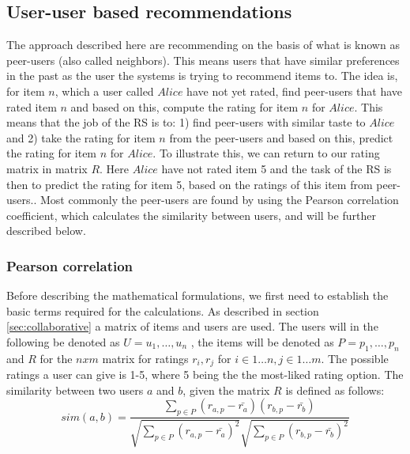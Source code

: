 \subsection{User-user based recommendations} %
\label{sub:user_user_based_recommendations}
The approach described here are recommending on the basis of what is known as peer-users (also called neighbors). This means users that have similar preferences in the past as the user the systems is trying to recommend items to. The idea is, for item \(n\), which a user called \(Alice\) have not yet rated, find peer-users that have rated item \(n\) and based on this, compute the rating for item \(n\) for \(Alice\). This means that the job of the RS is to: 1) find peer-users with similar taste to \(Alice\) and 2) take the rating for item \(n\) from the peer-users and based on this, predict the rating for item \(n\) for \(Alice\).\newline
To illustrate this, we can return to our rating matrix in matrix \(R\). Here \(Alice\) have not rated item 5 and the task of the RS is then to predict the rating for item 5, based on the ratings of this item from peer-users.. Most commonly the peer-users are found by using the Pearson correlation coefficient\citep{IntroductionRecommenderSystems}, which calculates the similarity between users, and will be further described below.

\subsubsection{Pearson correlation}
Before describing the mathematical formulations, we first need to establish the basic terms required for the calculations. As described in section \ref{sec:collaborative} a matrix of items and users are used. The users will in the following be denoted as \( U = {u_{1}, \ldots , u_{n}} \) , the items will be denoted as \( P = {p_{1}, \ldots , p_{n}} \) and \(R\) for the \({n x m}\) matrix for ratings \(r_{i}, r_{j}\) for \(i \in 1 \ldots n, j \in 1 \ldots m\). The possible ratings a user can give is 1-5, where 5 being the the most-liked rating option. 
The similarity between two users \(a\) and \(b\), given the matrix \(R\) is defined as follows:\\

\[
	sim(a,b) = \frac{\sum_{p\in P} (r_{a,p} - \bar{r_{a}})(r_{b,p} - \bar{r_{b}})}{\sqrt{\sum_{p\in P} (r_{a,p} - \bar{r_{a}})^2} \sqrt{\sum_{p\in P} (r_{b,p} - \bar{r_{b}})^2}}
\]


